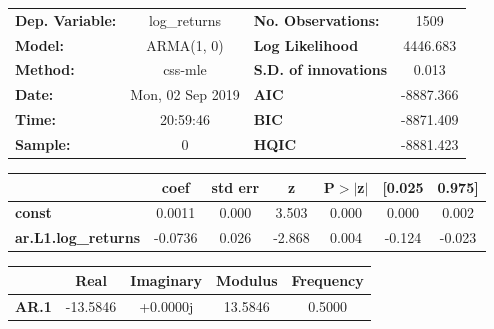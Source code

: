 \begin{center}
\begin{tabular}{lclc}
\toprule
\textbf{Dep. Variable:}     &        log\_returns       & \textbf{  No. Observations:  } &            1509            \\
\textbf{Model:}             &         ARMA(1, 0)        & \textbf{  Log Likelihood     } &          4446.683          \\
\textbf{Method:}            &          css-mle          & \textbf{  S.D. of innovations} &           0.013            \\
\textbf{Date:}              &      Mon, 02 Sep 2019     & \textbf{  AIC                } &         -8887.366          \\
\textbf{Time:}              &          20:59:46         & \textbf{  BIC                } &         -8871.409          \\
\textbf{Sample:}            &             0             & \textbf{  HQIC               } &         -8881.423          \\
\bottomrule
\end{tabular}
\begin{tabular}{lcccccc}
                            & \textbf{coef} & \textbf{std err} & \textbf{z} & \textbf{P$> |$z$|$} & \textbf{[0.025} & \textbf{0.975]}  \\
\midrule
\textbf{const}              &       0.0011  &        0.000     &     3.503  &         0.000        &        0.000    &        0.002     \\
\textbf{ar.L1.log\_returns} &      -0.0736  &        0.026     &    -2.868  &         0.004        &       -0.124    &       -0.023     \\
\bottomrule
\end{tabular}
\begin{tabular}{lcccc}
              & \textbf{            Real} & \textbf{         Imaginary} & \textbf{         Modulus} & \textbf{        Frequency}  \\
\midrule
\textbf{AR.1} &              -13.5846     &                +0.0000j     &               13.5846     &                0.5000       \\
\bottomrule
\end{tabular}
\end{center}
